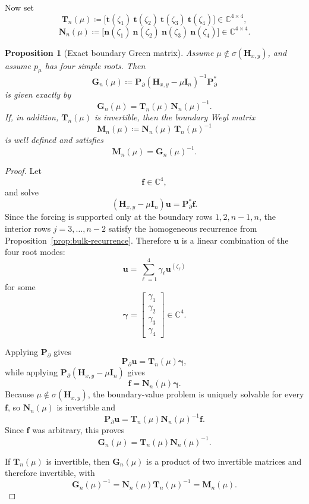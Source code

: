 \documentclass[11pt]{article}
\newtheorem{proposition}[theorem]{Proposition}
\begin{document}
Now set
\[
\mathbf T_n(\mu)\coloneqq
\bigl[\mathbf t(\zeta_1)\ \mathbf t(\zeta_2)\ \mathbf t(\zeta_3)\ \mathbf t(\zeta_4)\bigr]
\in\mathbb C^{4\times 4},
\]
\[
\mathbf N_n(\mu)\coloneqq
\bigl[\mathbf n(\zeta_1)\ \mathbf n(\zeta_2)\ \mathbf n(\zeta_3)\ \mathbf n(\zeta_4)\bigr]
\in\mathbb C^{4\times 4}.
\]

\begin{proposition}[Exact boundary Green matrix]\label{prop:four-root-boundary-green}
Assume \(\mu\notin\sigma(\mathbf H_{x,y})\), and assume \(p_\mu\) has four simple roots. Then
\[
\mathbf G_n(\mu)
\coloneqq
\mathbf P_\partial(\mathbf H_{x,y}-\mu\mathbf I_n)^{-1}\mathbf P_\partial^*
\]
is given exactly by
\[
\boxed{
\mathbf G_n(\mu)=\mathbf T_n(\mu)\,\mathbf N_n(\mu)^{-1}.
}
\]
If, in addition, \(\mathbf T_n(\mu)\) is invertible, then the boundary Weyl matrix
\[
\mathbf M_n(\mu)\coloneqq \mathbf N_n(\mu)\,\mathbf T_n(\mu)^{-1}
\]
is well defined and satisfies
\[
\boxed{
\mathbf M_n(\mu)=\mathbf G_n(\mu)^{-1}.
}
\]
\end{proposition}

\begin{proof}
Let
\[
\mathbf f\in\mathbb C^4,
\]
and solve
\[
(\mathbf H_{x,y}-\mu\mathbf I_n)\mathbf u=\mathbf P_\partial^* \mathbf f.
\]
Since the forcing is supported only at the boundary rows \(1,2,n-1,n\), the interior rows \(j=3,\dots,n-2\) satisfy the homogeneous recurrence from Proposition~\ref{prop:bulk-recurrence}. Therefore \(\mathbf u\) is a linear combination of the four root modes:
\[
\mathbf u=\sum_{\ell=1}^4 \gamma_\ell \mathbf u^{(\zeta_\ell)}
\]
for some
\[
\boldsymbol{\gamma}=
\begin{bmatrix}
\gamma_1\\
\gamma_2\\
\gamma_3\\
\gamma_4
\end{bmatrix}
\in\mathbb C^4.
\]

Applying \(\mathbf P_\partial\) gives
\[
\mathbf P_\partial\mathbf u=\mathbf T_n(\mu)\boldsymbol{\gamma},
\]
while applying \(\mathbf P_\partial(\mathbf H_{x,y}-\mu\mathbf I_n)\) gives
\[
\mathbf f=\mathbf N_n(\mu)\boldsymbol{\gamma}.
\]
Because \(\mu\notin\sigma(\mathbf H_{x,y})\), the boundary-value problem is uniquely solvable for every \(\mathbf f\), so \(\mathbf N_n(\mu)\) is invertible and
\[
\mathbf P_\partial\mathbf u=\mathbf T_n(\mu)\mathbf N_n(\mu)^{-1}\mathbf f.
\]
Since \(\mathbf f\) was arbitrary, this proves
\[
\mathbf G_n(\mu)=\mathbf T_n(\mu)\mathbf N_n(\mu)^{-1}.
\]

If \(\mathbf T_n(\mu)\) is invertible, then \(\mathbf G_n(\mu)\) is a product of two invertible matrices and therefore invertible, with
\[
\mathbf G_n(\mu)^{-1}
=
\mathbf N_n(\mu)\mathbf T_n(\mu)^{-1}
=
\mathbf M_n(\mu).
\]
\end{proof}
\end{document}
